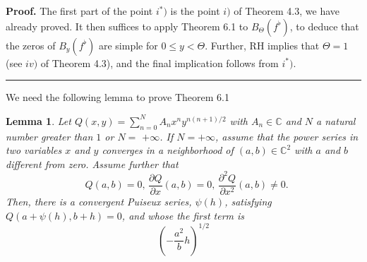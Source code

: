 \documentclass{article}
\newtheorem{lemma}[theorem]{Lemma}
\newenvironment{proof}[1][Proof]{\textbf{#1.} }{\ \rule{0.5em}{0.5em}}
\begin{document}
\begin{proof}
The first part of the point $i^{\ast })$ is the point $i)$ of Theorem 4.3,
we have already proved. It then suffices to apply Theorem 6.1 to $B_{\Theta
}\left( f^{\flat }\right) $, to deduce that the zeros of $B_{y}\left(
f^{\flat }\right) $ are simple for $0\leq y<\Theta $. Further, RH implies
that $\Theta =1$ (see $iv)$ of Theorem 4.3), and the final implication
follows from $i^{\ast })$.
\end{proof}

We need the following lemma to prove Theorem 6.1

\begin{lemma}
\bigskip Let $Q\left( x,y\right) =\sum_{n=0}^{N}A_{n}x^{n}y^{n\left(
n+1\right) /2}$ with $A_{n}\in \mathbb{C}$ and $N$ a natural number greater
than $1$ or $N=$ $+\infty $. If $N=+\infty $, assume that the power series
in two variables $x$ and $y$ converges in a neighborhood of $\left(
a,b\right) \in \mathbb{C}^{2}$ with $a$ and $b$ different from zero. Assume
further that 
\begin{equation*}
\text{ }Q\left( a,b\right) =0\text{, \ \ }\dfrac{\partial Q}{\partial x}\left( a,b\right) =0\text{, \ \ }\dfrac{\partial ^{2}Q}{\partial x^{2}}\left( a,b\right) \neq 0\text{.}
\end{equation*}
Then, there is a convergent Puiseux series, $\psi \left( h\right) $,
satisfying $Q\left( a+\psi \left( h\right) ,b+h\right) $\bigskip $=0$, and
whose the first term is 
\begin{equation}
\left( -\dfrac{a^{2}}{b}h\right) ^{1/2}
\end{equation}
\end{lemma}
\end{document}
